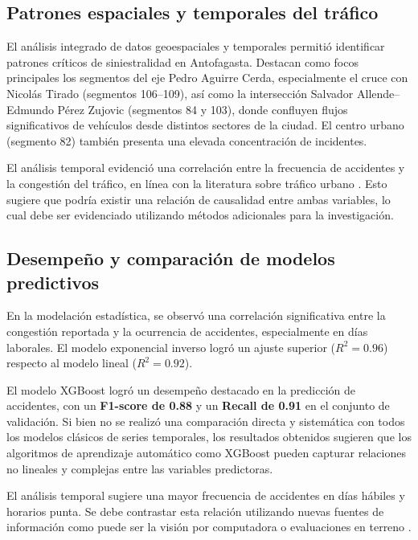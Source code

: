 \documentclass[12pt]{article}
\begin{document}
\subsection{Patrones espaciales y temporales del tráfico}

El análisis integrado de datos geoespaciales y temporales permitió identificar patrones críticos de siniestralidad en Antofagasta. Destacan como focos principales los segmentos del eje Pedro Aguirre Cerda, especialmente el cruce con Nicolás Tirado (segmentos 106–109), así como la intersección Salvador Allende–Edmundo Pérez Zujovic (segmentos 84 y 103), donde confluyen flujos significativos de vehículos desde distintos sectores de la ciudad. El centro urbano (segmento 82) también presenta una elevada concentración de incidentes.

El análisis temporal evidenció una correlación entre la frecuencia de accidentes y la congestión del tráfico, en línea con la literatura sobre tráfico urbano \parencite{berhanu2024}. Esto sugiere que podría existir una relación de causalidad entre ambas variables, lo cual debe ser evidenciado utilizando métodos adicionales para la investigación.

\subsection{Desempeño y comparación de modelos predictivos}

En la modelación estadística, se observó una correlación significativa entre la congestión reportada y la ocurrencia de accidentes, especialmente en días laborales. El modelo exponencial inverso logró un ajuste superior ($R^2 = 0.96$) respecto al modelo lineal ($R^2 = 0.92$).

El modelo XGBoost logró un desempeño destacado en la predicción de accidentes, con un \textbf{F1-score de 0.88} y un \textbf{Recall de 0.91} en el conjunto de validación. Si bien no se realizó una comparación directa y sistemática con todos los modelos clásicos de series temporales, los resultados obtenidos sugieren que los algoritmos de aprendizaje automático como XGBoost pueden capturar relaciones no lineales y complejas entre las variables predictoras.

El análisis temporal sugiere una mayor frecuencia de accidentes en días hábiles y horarios punta. Se debe contrastar esta relación utilizando nuevas fuentes de información como puede ser la visión por computadora o evaluaciones en terreno \parencite{goodall2019}.
\end{document}
